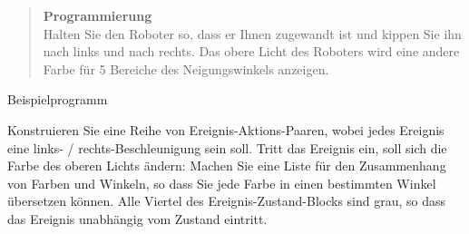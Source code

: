 
\begin{quote}
\textbf{Programmierung}\\
Halten Sie den Roboter so, dass er Ihnen zugewandt ist und kippen Sie ihn nach links und nach rechts. Das obere Licht des Roboters wird eine andere Farbe für 5 Bereiche des Neigungswinkels anzeigen.
\end{quote}

{\raggedleft \hfill {Beispielprogramm} }

Konstruieren Sie eine Reihe von Ereignis-Aktions-Paaren, wobei jedes Ereignis eine links- / rechts-Beschleunigung sein soll. Tritt das Ereignis ein, soll sich die Farbe des oberen Lichts ändern:
Machen Sie eine Liste für den Zusammenhang von Farben und Winkeln, so dass Sie jede Farbe in einen bestimmten Winkel übersetzen können.
Alle Viertel des Ereignis-Zustand-Blocks sind grau, so dass das Ereignis unabhängig vom Zustand eintritt. 

\bigskip



